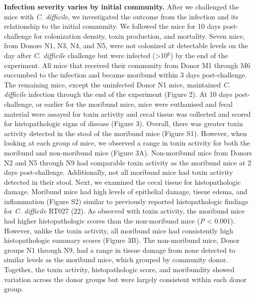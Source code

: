 \documentclass[
  12pt,
]{article}
\begin{document}
\textbf{Infection severity varies by initial community.} After we
challenged the mice with \emph{C. difficile}, we investigated the
outcome from the infection and its relationship to the initial
community. We followed the mice for 10 days post-challenge for
colonization density, toxin production, and mortality. Seven mice, from
Donors N1, N3, N4, and N5, were not colonized at detectable levels on
the day after \emph{C. difficile} challenge but were infected
(\textgreater10\(^{6}\)) by the end of the experiment. All mice that
received their community from Donor M1 through M6 succumbed to the
infection and became moribund within 3 days post-challenge. The
remaining mice, except the uninfected Donor N1 mice, maintained \emph{C.
difficile} infection through the end of the experiment (Figure 2). At 10
days post-challenge, or earlier for the moribund mice, mice were
euthanised and fecal material were assayed for toxin activity and cecal
tissue was collected and scored for histopathologic signs of disease
(Figure 3). Overall, there was greater toxin activity detected in the
stool of the moribund mice (Figure S1). However, when looking at each
group of mice, we observed a range in toxin activity for both the
moribund and non-moribund mice (Figure 3A). Non-moribund mice from
Donors N2 and N5 through N9 had comparable toxin activity as the
moribund mice at 2 days post-challenge. Additionally, not all moribund
mice had toxin activity detected in their stool. Next, we examined the
cecal tissue for histopathologic damage. Moribund mice had high levels
of epithelial damage, tissue edema, and inflammation (Figure S2) similar
to previously reported histopathologic findings for \emph{C. difficile}
RT027 (22). As observed with toxin activity, the moribund mice had
higher histopathologic scores than the non-moribund mice (\emph{P}
\textless{} 0.001). However, unlike the toxin activity, all moribund
mice had consistently high histopathologic summary scores (Figure 3B).
The non-moribund mice, Donor groups N1 through N9, had a range in tissue
damage from none detected to similar levels as the moribund mice, which
grouped by community donor. Together, the toxin activity,
histopathologic score, and moribundity showed variation across the donor
groups but were largely consistent within each donor group.
\end{document}
